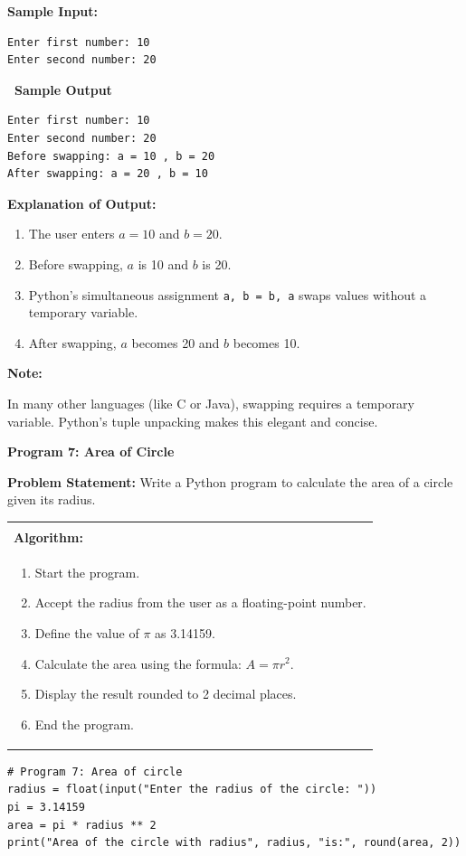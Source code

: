 \documentclass[12pt,a4paper]{article}
\makeatletter
\newcommand{\outhead}{\noindent\colorbox{cmrgreen!25}%
  {\textbf{\small\color{cmrdark}~Sample Output~}}\par\vspace{-1pt}}
\newenvironment{notebox}{%
  \par\vspace{4pt}%
  \noindent\textbf{Note:}\par\vspace{2pt}%
  \begin{minipage}{\linewidth}%
  \small%
}{%
  \end{minipage}\par\vspace{4pt}%
}
\newenvironment{algobox}{%
  \par\vspace{4pt}%
  \noindent\begin{tabular}{@{}p{\linewidth}@{}}%
  \hline\\[-8pt]%
  \textbf{\color{blue!60!black}\small Algorithm:}\\[2pt]%
}{%
  \\[-4pt]\hline%
  \end{tabular}\par\vspace{4pt}%
}
\makeatother
\begin{document}
\textbf{Sample Input:}
\begin{verbatim}
Enter first number: 10
Enter second number: 20
\end{verbatim}

\outhead
\begin{lstlisting}[style=outputstyle]
Enter first number: 10
Enter second number: 20
Before swapping: a = 10 , b = 20
After swapping: a = 20 , b = 10
\end{lstlisting}

\textbf{Explanation of Output:}
\begin{enumerate}
  \item The user enters $a = 10$ and $b = 20$.
  \item Before swapping, $a$ is 10 and $b$ is 20.
  \item Python's simultaneous assignment \texttt{a, b = b, a} swaps values without a temporary variable.
  \item After swapping, $a$ becomes 20 and $b$ becomes 10.
\end{enumerate}

\begin{notebox}
In many other languages (like C or Java), swapping requires a temporary variable. Python's tuple unpacking makes this elegant and concise.
\end{notebox}

\vspace{0.5cm}

\textbf{Program 7: Area of Circle}

\textbf{Problem Statement:}
Write a Python program to calculate the area of a circle given its radius.

\begin{algobox}
\begin{enumerate}[label=Step \arabic*:]
  \item Start the program.
  \item Accept the radius from the user as a floating-point number.
  \item Define the value of $\pi$ as 3.14159.
  \item Calculate the area using the formula: $A = \pi r^2$.
  \item Display the result rounded to 2 decimal places.
  \item End the program.
\end{enumerate}
\end{algobox}

\begin{lstlisting}
# Program 7: Area of circle
radius = float(input("Enter the radius of the circle: "))
pi = 3.14159
area = pi * radius ** 2
print("Area of the circle with radius", radius, "is:", round(area, 2))
\end{lstlisting}
\end{document}
